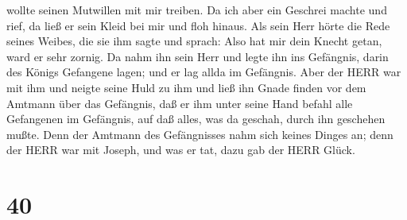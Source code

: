 wollte seinen Mutwillen mit mir treiben.  Da ich aber ein
Geschrei machte und rief, da ließ er sein Kleid bei mir und floh hinaus.
 Als sein Herr hörte die Rede seines Weibes, die sie ihm
sagte und sprach: Also hat mir dein Knecht getan, ward er sehr zornig.
 Da nahm ihn sein Herr und legte ihn ins Gefängnis, darin
des Königs Gefangene lagen; und er lag allda im Gefängnis. 
Aber der HERR war mit ihm und neigte seine Huld zu ihm und ließ ihn
Gnade finden vor dem Amtmann über das Gefängnis,  daß er
ihm unter seine Hand befahl alle Gefangenen im Gefängnis, auf daß alles,
was da geschah, durch ihn geschehen mußte.  Denn der
Amtmann des Gefängnisses nahm sich keines Dinges an; denn der HERR war
mit Joseph, und was er tat, dazu gab der HERR Glück.

\hypertarget{section-39}{%
\section{40}\label{section-39}}

